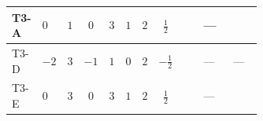 \documentclass[8pt]{article}
\begin{document}
\begin{landscape}
\begin{longtable}{@{}llcccccc >{\raggedright\arraybackslash}p{0.21\linewidth} >{\raggedright\arraybackslash}p{0.21\linewidth} >{\raggedright\arraybackslash}p{0.21\linewidth}@{}}
\midrule
T3-A & $0$ & $1$ & $0$ & $3$ & $1$ & $2$ & $\frac{1}{2}$ & \scriptsize\adjustbox{max width=\linewidth}{$\begin{gathered} +8 {\lambda_{H2}} {\lambda_{S_2}}\end{gathered}$} & --- & \scriptsize\adjustbox{max width=\linewidth}{$\begin{gathered} {\lambda_{H2}} (6 \operatorname{Tr}\!\left({Y_d}\,\left({Y_d}\right)^{\dagger}\right)+2 \operatorname{Tr}\!\left({Y_e}\,\left({Y_e}\right)^{\dagger}\right)+6 \operatorname{Tr}\!\left({Y_u}\,\left({Y_u}\right)^{\dagger}\right)+4 {\lambda_{S_2}^{\rm Adj}})\end{gathered}$} \\
\midrule
T3-D & $-2$ & $3$ & $-1$ & $1$ & $0$ & $2$ & $-\frac{1}{2}$ & \scriptsize\adjustbox{max width=\linewidth}{$\begin{gathered} +4 {\lambda_{H2}} {\lambda_{S_2}}\end{gathered}$} & --- & --- \\
\midrule
T3-E & $0$ & $3$ & $0$ & $3$ & $1$ & $2$ & $\frac{1}{2}$ & \scriptsize\adjustbox{max width=\linewidth}{$\begin{gathered} +8 {\lambda_{H2}} {\lambda_{S_2}}\end{gathered}$} & --- & \scriptsize\adjustbox{max width=\linewidth}{$\begin{gathered} {\lambda_{H2}} (6 \operatorname{Tr}\!\left({Y_d}\,\left({Y_d}\right)^{\dagger}\right)+2 \operatorname{Tr}\!\left({Y_e}\,\left({Y_e}\right)^{\dagger}\right)+6 \operatorname{Tr}\!\left({Y_u}\,\left({Y_u}\right)^{\dagger}\right)+4 {\lambda_{S_2}^{\rm Adj}})\end{gathered}$} \\
\midrule
\bottomrule
\end{longtable}
\clearpage

\end{landscape}
\end{document}
